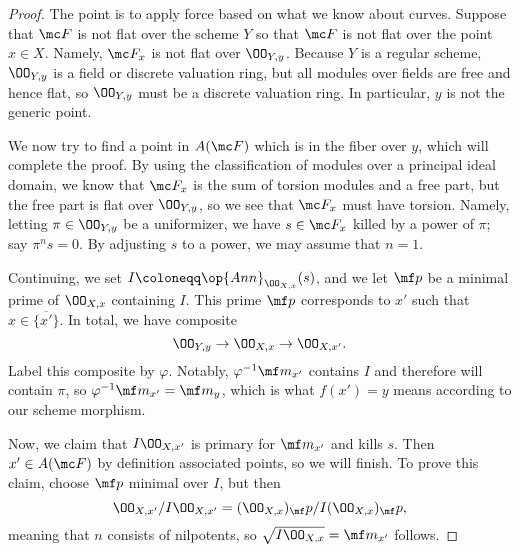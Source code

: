 \documentclass[../notes.tex]{subfiles}
\begin{document}
\begin{proof}
	The point is to apply force based on what we know about curves. Suppose that $\mc F$ is not flat over the scheme $Y$ so that $\mc F$ is not flat over the point $x\in X$. Namely, $\mc F_x$ is not flat over $\OO_{Y,y}$. Because $Y$ is a regular scheme, $\OO_{Y,y}$ is a field or discrete valuation ring, but all modules over fields are free and hence flat, so $\OO_{Y,y}$ must be a discrete valuation ring. In particular, $y$ is not the generic point.

	We now try to find a point in $A(\mc F)$ which is in the fiber over $y$, which will complete the proof. By using the classification of modules over a principal ideal domain, we know that $\mc F_x$ is the sum of torsion modules and a free part, but the free part is flat over $\OO_{Y,y}$, so we see that $\mc F_x$ must have torsion. Namely, letting $\pi\in\OO_{Y,y}$ be a uniformizer, we have $s\in\mc F_x$ killed by a power of $\pi$; say $\pi^ns=0$. By adjusting $s$ to a power, we may assume that $n=1$.

	Continuing, we set $I\coloneqq\op{Ann}_{\OO_{X,x}}(s)$, and we let $\mf p$ be a minimal prime of $\OO_{X,x}$ containing $I$. This prime $\mf p$ corresponds to $x'$ such that $x\in\overline{\{x'\}}$. In total, we have composite
	\[\OO_{Y,y}\to\OO_{X,x}\to\OO_{X,x'}.\]
	Label this composite by $\varphi$. Notably, $\varphi^{-1}\mf m_{x'}$ contains $I$ and therefore will contain $\pi$, so $\varphi^{-1}\mf m_{x'}=\mf m_y$, which is what $f(x')=y$ means according to our scheme morphism.

	Now, we claim that $I\OO_{X,x'}$ is primary for $\mf m_{x'}$ and kills $s$. Then $x'\in A(\mc F)$ by definition associated points, so we will finish. To prove this claim, choose $\mf p$ minimal over $I$, but then
	\[\OO_{X,x'}/I\OO_{X,x'}=(\OO_{X,x})_\mf p/I(\OO_{X,x})_\mf p,\]
	meaning that $n$ consists of nilpotents, so $\sqrt{I\OO_{X,x}}=\mf m_{x'}$ follows.
\end{proof}
\end{document}

